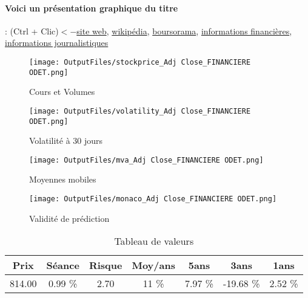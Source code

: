 \documentclass[11pt,a4paper]{report}%
\begin{document}
\paragraph{Voici un présentation graphique du titre} : (Ctrl + Clic)$<-$\href{http://financiere-odet.com/fr-fr/investisseurs/}{site web}, \href{https://fr.wikipedia.org/wiki/Bollor%C3%A9}{wikipédia}, \href{https://www.boursorama.com/cours/1rPODET}{boursorama}, \href{https://www.qwant.com/?q=site:https:%2f%2fwww.easybourse.com%2faction-societe%2fFINANCIERE-ODET&t=web&client=ext-firefox-hp}{informations financières}, \href{https://bourse.lerevenu.com/cours-de-bourse/fiche-valeur-synthese/FINANCIERE-ODET/ODET-FR}{informations journalistiques}
\begin{figure}[!htb]
   \begin{minipage}{0.5\textwidth}
     \centering
     \texttt{[image: OutputFiles/stockprice\_Adj Close\_FINANCIERE ODET.png]}
     \caption{Cours et Volumes}\label{Fig:price_FINANCIERE ODET}
   \end{minipage}\hfill
   \begin{minipage}{0.5\textwidth}
     \centering
     \texttt{[image: OutputFiles/volatility\_Adj Close\_FINANCIERE ODET.png]}
     \caption{Volatilité à 30 jours}\label{Fig:volat_FINANCIERE ODET}
   \end{minipage}
\end{figure}
\begin{figure}[!htb]
   \begin{minipage}{0.5\textwidth}
     \centering
     \texttt{[image: OutputFiles/mva\_Adj Close\_FINANCIERE ODET.png]}
     \caption{Moyennes mobiles}\label{Fig:mva_FINANCIERE ODET}
   \end{minipage}\hfill
   \begin{minipage}{0.5\textwidth}
     \centering
     \texttt{[image: OutputFiles/monaco\_Adj Close\_FINANCIERE ODET.png]}
     \caption{Validité de prédiction}\label{Fig:prediction_FINANCIERE ODET}
   \end{minipage}
\end{figure}

\begin{table}[H]
  \centering
    \begin{tabular}{|c|c|c|c|c|c|c|}
    \hline
    Prix & Séance & Risque  & Moy/ans & 5ans & 3ans & 1ans \\
    \hline
    814.00 &    0.99 \%    & 2.70 & 11 \% & 7.97 \% & -19.68 \% & 2.52 \% \\
    \hline
    \end{tabular}%
        \label{tab:table_FINANCIERE ODET}%
      \caption{Tableau de valeurs}
\end{table}%
\end{document}
